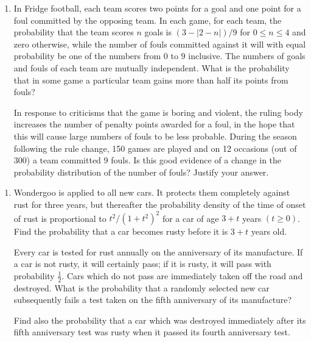 \documentclass[a4, 11pt]{report}
\newlength{\qspace}
\newcounter{qnumber}
\newenvironment{question}%
 {\vspace{\qspace}
  \begin{enumerate}[\bfseries 1\quad][10]%
    \setcounter{enumi}{\value{qnumber}}%
    \item%
 }
{
  \end{enumerate}
  \filbreak
  \stepcounter{qnumber}
 }
\begin{document}
\begin{question}
In Fridge football, each team scores two points for a goal and one
point for a foul committed by the opposing team. In each game, for
each team, the probability that the team scores $n$ goals is $\left(3-\left|2-n\right|\right)/9$
for $0\leqslant n\leqslant4$ and zero otherwise, while the number
of fouls committed against it will with equal probability be one of
the numbers from $0$ to $9$ inclusive. The numbers of goals and
fouls of each team are mutually independent. What is the probability
that in some game a particular team gains more than half its points
from fouls?


In response to criticisms that the game is boring and violent, the
ruling body increases the number of penalty points awarded for a foul,
in the hope that this will cause large numbers of fouls to be less
probable. During the season following the rule change, 150 games are
played and on 12 occasions (out of 300) a team committed 9 fouls.
Is this good evidence of a change in the probability distribution
of the number of fouls? Justify your answer. 
\end{question}

\begin{question}
Wondergoo is applied to all new cars. It protects them completely
against rust for three years, but thereafter the probability density
of the time of onset of rust is proportional to $t^{2}/(1+t^{2})^{2}$
for a car of age $3+t$ years $(t\geqslant0)$. Find the probability
that a car becomes rusty before it is $3+t$ years old. 


Every car is tested for rust annually on the anniversary of its manufacture.
If a car is not rusty, it will certainly pass; if it is rusty, it
will pass with probability $\frac{1}{2}.$ Cars which do not pass
are immediately taken off the road and destroyed. What is the probability
that a randomly selected new car subsequently fails a test taken on
the fifth anniversary of its manufacture?


Find also the probability that a car which was destroyed immediately
after its fifth anniversary test was rusty when it passed its fourth
anniversary test.
	\end{question}
\end{document}
